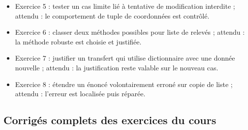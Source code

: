 \begin{itemize}
  \texttt{{[}{[}1{]},\ {[}2{]}{]}} ; attendu : modification locale
  contrôlée.
\item
  Exercice 5 : tester un cas limite lié à tentative de modification
  interdite ; attendu : le comportement de tuple de coordonnées est
  contrôlé.
\item
  Exercice 6 : classer deux méthodes possibles pour liste de relevés ;
  attendu : la méthode robuste est choisie et justifiée.
\item
  Exercice 7 : justifier un transfert qui utilise dictionnaire avec une
  donnée nouvelle ; attendu : la justification reste valable sur le
  nouveau cas.
\item
  Exercice 8 : étendre un énoncé volontairement erroné sur copie de
  liste ; attendu : l'erreur est localisée puis réparée.
\end{itemize}

\subsection{Corrigés complets des exercices du cours}

